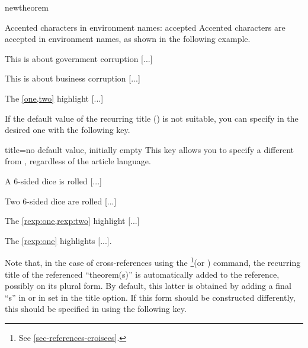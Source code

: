 \documentclass[english,nolocaltoc]{nwejmart}
\newtheorem[style=definition]{fact}
\newtheorem{exposé}
\newtheorem[title-plural=Criteria]{criterion}
\newtheorem[title=random experiment]{rexp}
\begin{document}
\begin{docCommand}{newtheorem}{}
  \begin{dbremark}{Accented characters in environment names: accepted}{}
    Accented characters are accepted in environment names, as shown in the
    following example.
  \end{dbremark}

\begin{bodycode}[listing and text,listing options={deletekeywords={[2]label}}]
\begin{exposé}\label{one}
  This is about government corruption [...]
\end{exposé}
\begin{exposé}\label{two}
  This is about business corruption [...]
\end{exposé}
The \vref{one,two} highlight [...]
\end{bodycode}

  If the  default value of the recurring title  () is not
  suitable, you can specify in  the desired one with
  the following   key.
  \begin{docKey}{title}{={}}{no  default value,
      initially empty}
    This key allows you to specify a  different from
    , regardless of the article language.
  \end{docKey}
\begin{bodycode}[listing and text,listing options={deletekeywords={[2]label}}]
\begin{rexp}\label{rexp:one}
  A 6-sided dice is rolled [...]
\end{rexp}
\begin{rexp}\label{rexp:two}
  Two 6-sided dice are rolled [...]
\end{rexp}
The \vref{rexp:one,rexp:two} highlight [...]

The \vref{rexp:one} highlights [...].
\end{bodycode}

\end{docCommand}

  Note that, in the case of cross-references using the
  \footnote{See \vref{sec-references-croisees}.}(or )
  command, the recurring title of the referenced \enquote{theorem(s)} is
  automatically added to the reference, possibly on its plural form. By default,
  this latter is obtained by adding a final \enquote{s} in  or in
   set in the title option. If this form should be
  constructed differently, this should be specified in  using
  the following  key.
\end{document}
